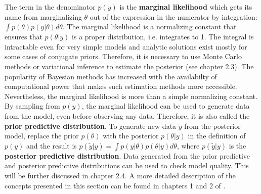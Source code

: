 The term in the denominator $p(y)$ is the \textbf{marginal likelihood} which gets its name from marginalizing $\theta$ out of the expression in the numerator by integration: $\int p(\theta) p(y|\theta)d\theta$.
The marginal likelihood is a normalizing constant that ensures that $p(\theta|y)$ is a proper distribution, i.e. integrates to 1.
The integral is intractable even for very simple models and analytic solutions exist mostly for some cases of conjugate priors.
Therefore, it is necessary to use Monte Carlo methods or variational inference to estimate the posterior (see chapter 2.3). The popularity of Bayesian methods has increased with the availabilty of computational power that makes such estimation methods more accessible.
Nevertheless, the marginal likelihood is more than a simple normalizing constant.
By sampling from $p(y)$, the marginal likelihood can be used to generate data from the model, even before observing any data.
Therefore, it is also called the \textbf{prior predictive distribution}.
To generate new data  $\tilde y$ from the posterior model, replace the prior $p(\theta)$ with the posterior $p(\theta|y)$ in the definition of $p(y)$ and the result is $p(\tilde y|y) = \int p(y | \theta) p(\theta|y) d\theta$, where $p(\tilde y | y)$ is the \textbf{posterior predictive distribution}.
Data generated from the prior predictive and posterior predictive distributions can be used to check model quality.
This will be further discussed in chapter 2.4.
A more detailed description of the concepts presented in this section can be found in chapters 1 and 2 of \cite{gelman_bayesian_2014}.


